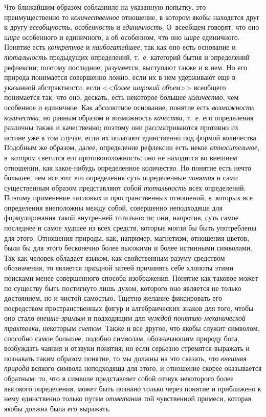 Что ближайшим образом соблазнило на указанную попытку, это
преимущественно то {\em количественное}
отношение, в котором якобы находятся друг к другу
{\em всеобщность, особенность} и {\em единичность}.
О~всеобщем говорят, что оно {\em шире}
особенного и единичного, а об особенном, что оно
{\em шире} единичного. Понятие есть {\em конкретное}
и {\em наибогатейшее}, так как оно есть основание и {\em тотальность}
предыдущих определений, т.~е. категорий бытия и определений
рефлексии; поэтому последние, разумеется, выступают также и в нем. Но его
природа понимается совершенно ложно, если их в нем удерживают еще в
указанной абстрактности, если <<{\em более широкий объем}>>
всеобщего понимается так, что оно, дескать, есть некоторое
большее {\em количество}, чем особенное и единичное. Как абсолютное
основание, понятие есть {\em возможность количества},
но равным образом и возможность {\em качества}, т.~е. его
определения различны также и качественно; поэтому они рассматриваются
противно их истине уже в том случае, если их полагают единственно под
формой количества. Подобным же образом, далее, определение рефлексии есть
некое {\em относительное},
в~котором светится его противоположность; оно не находится во
внешнем отношении, как какое-нибудь определенное количество. Но понятие
есть нечто б\'{о}льшее, чем все это; его определения суть определенные
{\em понятия} и сами существенным образом представляют собой {\em тотальность}
всех определений. Поэтому применение числовых и пространственных отношений,
в~которых все определения внеположны между собой, совершенно неподходяще для
формулирования такой внутренней тотальности; они, напротив, суть самое
последнее и самое худшее из всех средств, которые могли бы быть употреблены
для этого. Отношения природы, как, например, магнетизм, отношения цветов,
были бы для этого бесконечно более высокими и более истинными символами.
Так как человек обладает языком, как свойственным разуму средством
обозначения, то является праздной затеей причинять себе
хлопоты этими поисками менее совершенного способа изображения. Понятие как
таковое может по существу быть постигнуто лишь духом, которого оно является
не только достоянием, но и чистой самостью. Тщетно желание фиксировать его
посредством пространственных фигур и алгебраических знаков для того, чтобы
оно стало {\em внешне-зримым} и подходящим для {\em чуждой понятию
механической трактовки}, некоторым {\em счетом}. Также и все
другое, что якобы служит символом, способно самое большее, подобно
символам, обозначающим природу бога, возбуждать чаяния и отзвуки понятия;
но если серьезно стремятся выражать и познавать таким образом понятие, то
мы должны на это сказать, что {\em внешняя природа}
всякого символа неподходяща для этого, и отношение скорее
оказывается обратным: то, что в символе представляет собой отзвук
некоторого более высокого определения, может быть познано только через
понятие и приближено к нему единственно только путем {\em отметания} той
чувственной примеси, которая якобы должна была его выражать.

